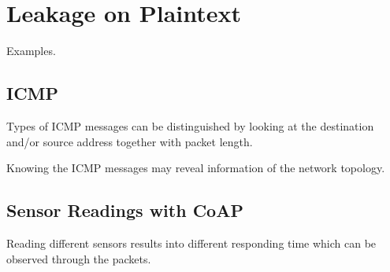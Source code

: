 \section{Leakage on Plaintext}

Examples.

\subsection{ICMP}

Types of ICMP messages can be distinguished by looking at the destination and/or source address together with packet length.

Knowing the ICMP messages may reveal information of the network topology.


\subsection{Sensor Readings with CoAP}

Reading different sensors results into different responding time which can be observed through the packets.
